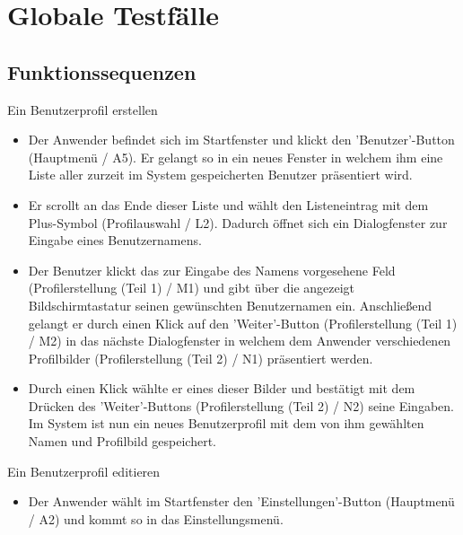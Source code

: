 
\section{Globale Testfälle}

\subsection{Funktionssequenzen}

\begin{requirements}

	 Ein Benutzerprofil erstellen
	
	
	\begin{itemize}
  			\item Der Anwender befindet sich im Startfenster und klickt den 'Benutzer'-Button (Hauptmenü / A5). Er gelangt so in ein neues Fenster in welchem ihm eine Liste aller zurzeit im System gespeicherten Benutzer präsentiert wird.
  			
  			\item Er scrollt an das Ende dieser Liste und wählt den Listeneintrag mit dem Plus-Symbol (Profilauswahl / L2). Dadurch öffnet sich ein Dialogfenster zur Eingabe eines Benutzernamens.
  			
  			\item Der Benutzer klickt das zur Eingabe des Namens vorgesehene Feld (Profilerstellung (Teil 1) / M1) und gibt über die angezeigt Bildschirmtastatur seinen gewünschten Benutzernamen ein. Anschließend gelangt er durch einen Klick auf den 'Weiter'-Button (Profilerstellung (Teil 1) / M2) in das nächste Dialogfenster in welchem dem Anwender verschiedenen Profilbilder (Profilerstellung (Teil 2) / N1) präsentiert werden.
  			
  			\item Durch einen Klick wählte er eines dieser Bilder und bestätigt mit dem Drücken des 'Weiter'-Buttons (Profilerstellung (Teil 2) / N2) seine Eingaben. Im System ist nun ein neues Benutzerprofil mit dem von ihm gewählten Namen und Profilbild gespeichert.
  	\end{itemize}
  	
  	
	
	 Ein Benutzerprofil editieren
	
	
	\begin{itemize}
  			\item Der Anwender wählt im Startfenster den 'Einstellungen'-Button (Hauptmenü / A2) und kommt so in das Einstellungsmenü.
  			

\end{itemize}
\end{requirements}
